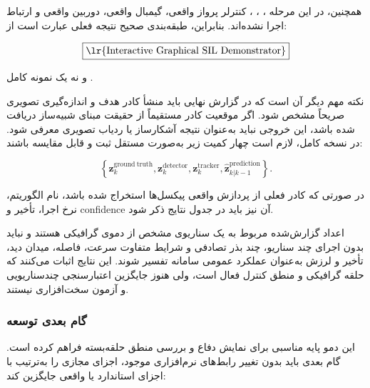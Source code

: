 \documentclass[12pt,a4paper]{article}
\begin{document}
همچنین، در این مرحله
،
،
،
کنترلر پرواز واقعی، گیمبال واقعی، دوربین واقعی و ارتباط
اجرا نشده‌اند. بنابراین، طبقه‌بندی صحیح نتیجه فعلی عبارت است از:

\begin{equation}
	\boxed{
		\text{\lr{Interactive Graphical SIL Demonstrator}}
	}
	\label{eq:demo_correct_classification}
\end{equation}

و نه یک نمونه کامل
.

نکته مهم دیگر آن است که در گزارش نهایی باید منشأ کادر هدف و
اندازه‌گیری تصویری صریحاً مشخص شود. اگر موقعیت کادر مستقیماً از
حقیقت مبنای شبیه‌ساز دریافت شده باشد، این خروجی نباید به‌عنوان
نتیجه آشکارساز یا ردیاب تصویری معرفی شود. در نسخه کامل، لازم است
چهار کمیت زیر به‌صورت مستقل ثبت و قابل مقایسه باشند:

\begin{equation}
	\left\{
	\mathbf z_k^{\mathrm{ground\ truth}},
	\mathbf z_k^{\mathrm{detector}},
	\mathbf z_k^{\mathrm{tracker}},
	\widehat{\mathbf z}_{k|k-1}^{\mathrm{prediction}}
	\right\}.
	\label{eq:perception_sources_separation}
\end{equation}

در صورتی که کادر فعلی از پردازش واقعی پیکسل‌ها استخراج شده باشد،
نام الگوریتم، نرخ اجرا، تأخیر و confidence آن نیز باید در جدول
نتایج ذکر شود.

\begin{warningbox}
	اعداد گزارش‌شده مربوط به یک سناریوی مشخص از دموی گرافیکی هستند و
	نباید بدون اجرای چند سناریو، چند بذر تصادفی و شرایط متفاوت سرعت،
	فاصله، میدان دید، تأخیر و لرزش به‌عنوان عملکرد عمومی سامانه
	تفسیر شوند. این نتایج اثبات می‌کنند که حلقه گرافیکی و منطق کنترل
	فعال است، ولی هنوز جایگزین اعتبارسنجی چندسناریویی و آزمون
	سخت‌افزاری نیستند.
\end{warningbox}

\subsubsection{گام بعدی توسعه}
\label{subsubsec:demo_next_stage}

این دمو پایه مناسبی برای نمایش دفاع و بررسی منطق حلقه‌بسته فراهم
کرده است. گام بعدی باید بدون تغییر رابط‌های نرم‌افزاری موجود،
اجزای مجازی را به‌ترتیب با اجزای استاندارد یا واقعی جایگزین کند:
\end{document}
